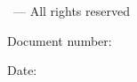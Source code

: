 
\thispagestyle{empty}
{\raisebox{.35ex}{\smaller\copyright}}\,\doccopyrightholder{} \doccopyrightyears{} --- All rights reserved
\vspace{2ex}

\begin{flushright}
Document number: \textbf{\LARGE\docno}

Date: \reldate
\end{flushright}

\vfill

\textbf{\LARGE \doctitle}

\vfill





\vfill
\noindent
\pagebreak

\thispagestyle{cpppage}




